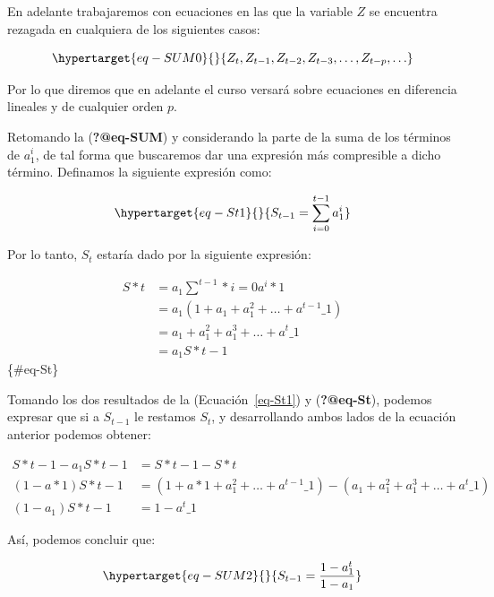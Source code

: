 \documentclass[
  a4paper,
]{article}
\begin{document}
En adelante trabajaremos con ecuaciones en las que la variable \(Z\) se
encuentra rezagada en cualquiera de los siguientes casos:

\begin{equation}\protect\hypertarget{eq-SUM0}{}{
Z_t, Z_{t-1}, Z_{t-2}, Z_{t-3}, \ldots, Z_{t-p}, \ldots
}\label{eq-SUM0}\end{equation}

Por lo que diremos que en adelante el curso versará sobre ecuaciones en
diferencia lineales y de cualquier orden \(p\).

Retomando la (\textbf{?@eq-SUM}) y considerando la parte de la suma de
los términos de \(a^i_1\), de tal forma que buscaremos dar una expresión
más compresible a dicho término. Definamos la siguiente expresión como:

\begin{equation}\protect\hypertarget{eq-St1}{}{
S_{t-1} = \sum^{t-1}_{i = 0}{a^i_1}
}\label{eq-St1}\end{equation}

Por lo tanto, \(S_t\) estaría dado por la siguiente expresión:

\begin{align}
S*{t} & = a_1 \sum^{t-1}*{i = 0}{a^i*1} \nonumber \\
& = a_1 (1 + a_1 + a^2_1 + \ldots + a^{t-1}\_1) \nonumber \\
& = a_1 + a^2_1 + a^3_1 + \ldots + a^{t}\_1 \nonumber \\
& = a_1 S*{t-1}
\end{align} \{\#eq-St\}

Tomando los dos resultados de la (Ecuación~\ref{eq-St1}) y
(\textbf{?@eq-St}), podemos expresar que si a \(S_{t-1}\) le restamos
\(S_t\), y desarrollando ambos lados de la ecuación anterior podemos
obtener:

\begin{align}
S*{t-1} - a_1 S*{t-1} & = S*{t-1} - S*{t} \nonumber \\
(1 - a*1) S*{t-1} & = (1 + a*1 + a^2_1 + \ldots + a^{t-1}\_1) - (a_1 + a^2_1 + a^3_1 + \ldots + a^{t}\_1) \nonumber \\
(1 - a_1) S*{t-1} & = 1 - a^{t}\_1 \nonumber
\end{align}

Así, podemos concluir que:

\begin{equation}\protect\hypertarget{eq-SUM2}{}{
S_{t-1} = \frac{1 - a^{t}_1}{1 - a_1}
}\label{eq-SUM2}\end{equation}
\end{document}
